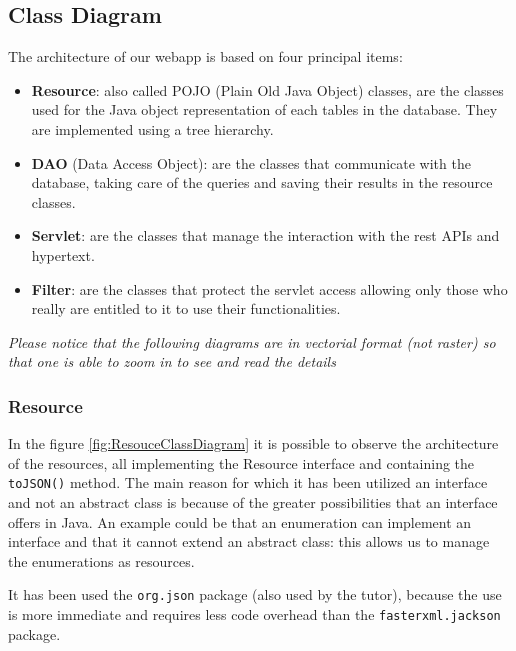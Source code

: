 \subsection{Class Diagram}

The architecture of our webapp is based on four principal items:
\begin{itemize}
    \item \textbf{Resource}: also called POJO (Plain Old Java Object) classes, are the classes used for the Java object representation of each tables in the database. They are implemented using a tree hierarchy.
    \item \textbf{DAO} (Data Access Object): are the classes that communicate with the database, taking care of the queries and saving their results in the resource classes.
    \item \textbf{Servlet}: are the classes that manage the interaction with the rest APIs and hypertext.
    \item \textbf{Filter}: are the classes that protect the servlet access allowing only those who really are entitled to it to use their functionalities.
\end{itemize}

\textit{Please notice that the following diagrams are in vectorial format (not raster) so that one is able to zoom in to see and read the details}

\subsubsection*{Resource}

In the figure \ref{fig:ResouceClassDiagram} it is possible to observe the 
architecture of the resources, all implementing the Resource interface
and containing the \texttt{toJSON()} method.
The main reason for which it has been utilized an interface and not an abstract
class is because of the greater possibilities that an interface offers in
Java. An example could be that an enumeration can implement an interface and that it cannot
extend an abstract class: this allows us to manage the enumerations
as resources.

It has been used the \texttt{org.json} package (also used by the tutor), because the
use is more  immediate and requires less code overhead than the
\texttt{fasterxml.jackson} package.



